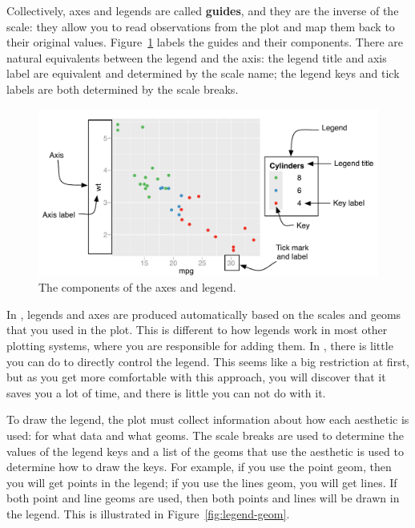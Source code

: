 Collectively, axes and legends are called {\bf guides}, and they are the inverse of the scale: they allow you to read observations from the plot and map them back to their original values.  Figure~\ref{fig:labelled-guides} labels the guides and their components.  There are natural equivalents between the legend and the axis: the legend title and axis label are equivalent and determined by the scale name; the legend keys and tick labels are both determined by the scale breaks.

\begin{figure}[htbp]
  \centering
  \includegraphics[width=\linewidth]{scale-guides}
  
  \caption{The components of the axes and legend.}
  \label{fig:labelled-guides}
\end{figure}

In \ggplot, legends and axes are produced automatically based on the scales and geoms that you used in the plot. This is different to how legends work in most other plotting systems, where you are responsible for adding them.  In \ggplot, there is little you can do to directly control the legend.  This seems like a big restriction at first, but as you get more comfortable with this approach, you will discover that it saves you a lot of time, and there is little you can not do with it.

To draw the legend, the plot must collect information about how each aesthetic is used: for what data and what geoms. The scale breaks are used to determine the values of the legend keys and a list of the geoms that use the aesthetic  is used to determine how to draw the keys. For example, if you use the point geom, then you will get points in the legend; if you use the lines geom, you will get lines. If both point and line geoms are used, then both points and lines will be drawn in the legend.  This is illustrated in Figure~\ref{fig:legend-geom}.


